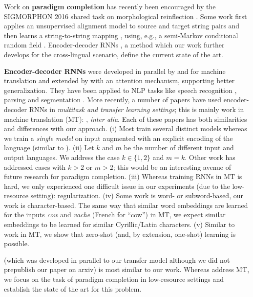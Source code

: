 \documentclass[11pt,letterpaper]{article}
\begin{document}
Work on \textbf{paradigm completion} has recently been encouraged by the
SIGMORPHON 2016 shared task on morphological reinflection
\cite{cotterell-et-al-2016-shared}.  Some work first applies an unsupervised
alignment model to source and target string pairs 
and then learns a string-to-string mapping
\cite{durrett2013supervised,nicolai2015inflection}, using, e.g.,
a semi-Markov conditional random field
\cite{sarawagi2004semi}. 
Encoder-decoder RNNs
\cite{aharoni2016improving,faruqui2015morphological,kann2016med},
a method which our work further develops for the
cross-lingual scenario, define the current state of the art.


\textbf{Encoder-decoder RNNs} were developed in parallel by
 and
 for machine translation and
extended by  with an attention
mechanism, supporting better generalization. They have been
applied to NLP tasks like speech recognition
\cite{graves2005framewise,graves2013speech}, parsing
\cite{vinyals2015grammar} and segmentation
\cite{kann2016neural}.  More recently, a number of papers
have used encoder-decoder RNNs in \emph{multitask and transfer
learning settings}; this is mainly work in machine
translation (MT):
\cite{dong15multitask,zoph2016multi,chu2017,JohnsonSLKWCTVW16,luong2016iclr_multi,firat16multiway,ha2016toward},
     {\em inter alia}.
Each of these papers has both similarities and differences
with our approach. (i) Most train several distinct models
whereas we train a \emph{single model} on input augmented with an
explicit encoding of the language (similar to \cite{JohnsonSLKWCTVW16}). 
(ii) Let $k$ and $m$ be the number of different input and output
languages.  We address the case $k \in \{1,2\}$ and $m=k$.
Other work has addressed cases with $k>2$ or $m>2$; this would
be an interesting avenue of future research for paradigm
completion. 
(iii) Whereas training RNNs in MT is hard, we only
experienced one difficult issue in our experiments (due to
the low-resource setting):
regularization.
(iv) Some work is word- or subword-based, our
work is character-based. The same way that similar word
embeddings are learned for the inputs \emph{cow} and
\emph{vache} (French for ``cow'') in MT, we expect similar
embeddings to be learned for similar Cyrillic/Latin characters. (v)
Similar to work in MT, we show that zero-shot (and, by extension,
one-shot) learning is possible.


\cite{ha2016toward} 
(which was developed in parallel to our transfer model although we
did not prepublish our paper on arxiv)
is most similar to
our work. Whereas 
 address MT, we focus
on the task of paradigm completion in
low-resource settings and establish the state of the art
for this problem.
\end{document}
